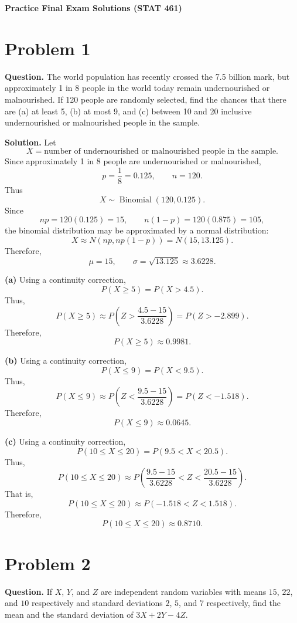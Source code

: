 \documentclass[11pt]{article}
\begin{document}
\begin{center}
    {\Large \textbf{Practice Final Exam Solutions (STAT 461)}}
\end{center}

\section*{Problem 1}

\textbf{Question.} The world population has recently crossed the 7.5 billion mark, but approximately 1 in 8 people in the world today remain undernourished or malnourished. If 120 people are randomly selected, find the chances that there are (a) at least 5, (b) at most 9, and (c) between 10 and 20 inclusive undernourished or malnourished people in the sample.

\textbf{Solution.} Let
\[
X=\text{number of undernourished or malnourished people in the sample}.
\]
Since approximately 1 in 8 people are undernourished or malnourished,
\[
p=\frac{1}{8}=0.125, \qquad n=120.
\]
Thus
\[
X\sim \operatorname{Binomial}(120,0.125).
\]
Since
\[
np=120(0.125)=15, \qquad n(1-p)=120(0.875)=105,
\]
the binomial distribution may be approximated by a normal distribution:
\[
X\approx N\left(np, np(1-p)\right)=N(15,13.125).
\]
Therefore,
\[
\mu=15, \qquad \sigma=\sqrt{13.125}\approx 3.6228.
\]

\textbf{(a)} Using a continuity correction,
\[
P(X\ge 5)=P(X>4.5).
\]
Thus,
\[
P(X\ge 5)\approx P\left(Z>\frac{4.5-15}{3.6228}\right)=P(Z>-2.899).
\]
Therefore,
\[
\boxed{P(X\ge 5)\approx 0.9981}.
\]

\textbf{(b)} Using a continuity correction,
\[
P(X\le 9)=P(X<9.5).
\]
Thus,
\[
P(X\le 9)\approx P\left(Z<\frac{9.5-15}{3.6228}\right)=P(Z<-1.518).
\]
Therefore,
\[
\boxed{P(X\le 9)\approx 0.0645}.
\]

\textbf{(c)} Using a continuity correction,
\[
P(10\le X\le 20)=P(9.5<X<20.5).
\]
Thus,
\[
P(10\le X\le 20)\approx P\left(\frac{9.5-15}{3.6228}<Z<\frac{20.5-15}{3.6228}\right).
\]
That is,
\[
P(10\le X\le 20)\approx P(-1.518<Z<1.518).
\]
Therefore,
\[
\boxed{P(10\le X\le 20)\approx 0.8710}.
\]

\newpage
\section*{Problem 2}

\textbf{Question.} If $X$, $Y$, and $Z$ are independent random variables with means $15$, $22$, and $10$ respectively and standard deviations $2$, $5$, and $7$ respectively, find the mean and the standard deviation of $3X+2Y-4Z$.
\end{document}
